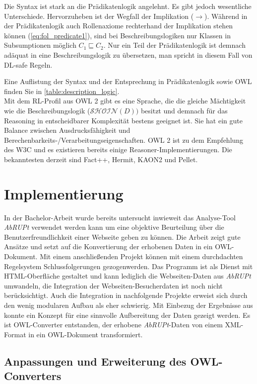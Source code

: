 \documentclass[runningheads,a4paper]{llncs}
\begin{document}
Die Syntax ist stark an die Prädikatenlogik angelehnt. 
Es gibt jedoch wesentliche Unterschiede. 
Hervorzuheben ist der Wegfall der Implikation (\(\to\)). 
Während in der Prädikatenlogik auch Rollenaxiome rechterhand der Implikation stehen können (\eqref{eq:fol_predicate1}), sind bei Beschreibungslogiken nur Klassen in Subsumptionen möglich \(C_1 \sqsubseteq C_2\).
Nur ein Teil der Prädikatenlogik ist demnach adäquat in eine Beschreibungslogik zu übersetzen, man spricht in diesem Fall von DL-safe Regeln. 

Eine Auflistung der Syntax und der Entsprechung in Prädikatenlogik sowie OWL finden Sie in \ref{table:description_logic}.
\\
Mit dem RL-Profil aus OWL 2 \cite{owl2rl} gibt es eine Sprache, die die gleiche Mächtigkeit wie die Beschreibungslogik (\(\mathcal{SHOIN}(D))\) besitzt und demnach für das Reasoning in entscheidbarer Komplexität bestens geeignet ist.
Sie hat ein gute Balance zwischen Ausdrucksfähigkeit und Berechenbarkeits-/Verarbeitungseigenschaften.
OWL 2 ist zu dem Empfehlung des W3C und es existieren bereits einige Reasoner-Implementierungen. 
Die bekanntesten derzeit sind Fact++, Hermit, KAON2 und Pellet.


\section{Implementierung}

In der Bachelor-Arbeit \cite{Brieger} wurde bereits untersucht inwieweit das Analyse-Tool \textit{AbRUPt} \cite{url_abrupt} verwendet werden kann um eine objektive Beurteilung über die Benutzerfreundlichkeit einer Webseite geben zu können. 
Die Arbeit zeigt gute Ansätze und setzt auf die Konvertierung der erhobenen Daten in ein OWL-Dokument. 
Mit einem anschließenden Projekt können mit einem durchdachten Regelsystem Schlussfolgerungen gezogenwerden. 
Das Programm ist als Dienst mit HTML-Oberfläche gestaltet und kann lediglich die Webseiten-Daten aus \textit{AbRUPt} umwandeln, die Integration der Webseiten-Besucherdaten ist noch nicht berücksichtigt. 
Auch die Integration in nachfolgende Projekte erweist sich durch den wenig modularen Aufbau als eher schwierig. 
Mit Einbezug der Ergebnisse aus \cite{Martin} konnte ein Konzept für eine sinnvolle Aufbereitung der Daten gezeigt werden. 
Es ist OWL-Converter entstanden, der erhobene \textit{AbRUPt}-Daten von einem XML-Format in ein OWL-Dokument transformiert.

\subsection{Anpassungen und Erweiterung des OWL-Converters}
\end{document}
